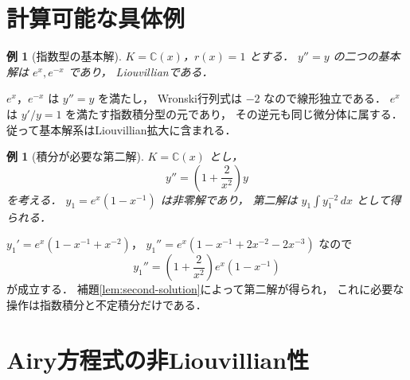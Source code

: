 \documentclass[a5paper,10pt,onecolumn]{jsarticle}
\makeatletter
\theoremstyle{mathnotetheorem}
\newtheorem{example}[theorem]{例}
\renewcommand{\proofname}{証明}
\renewenvironment{proof}[1][\proofname]{%
  \par\pushQED{\qed}\normalfont\topsep4\p@\@plus2\p@\relax
  \trivlist\item[\hskip\labelsep\bfseries #1]\ignorespaces
}{\popQED\endtrivlist\@endpefalse}
\makeatother
\begin{document}
\section{計算可能な具体例}

\begin{example}[指数型の基本解]
$K=\mathbb C(x)$，$r(x)=1$ とする．
$y''=y$ の二つの基本解は $e^x,e^{-x}$ であり，
Liouvillianである．
\end{example}
\begin{proof}
$e^x$，$e^{-x}$ は $y''=y$ を満たし，
Wronski行列式は $-2$ なので線形独立である．
$e^x$ は $y'/y=1$ を満たす指数積分型の元であり，
その逆元も同じ微分体に属する．
従って基本解系はLiouvillian拡大に含まれる．
\end{proof}

\begin{example}[積分が必要な第二解]
$K=\mathbb C(x)$ とし，
\[
 y''=\left(1+\frac2{x^2}\right)y
\]
を考える．
$y_1=e^x(1-x^{-1})$ は非零解であり，
第二解は $y_1\int y_1^{-2}\,dx$ として得られる．
\end{example}
\begin{proof}
$y_1'=e^x(1-x^{-1}+x^{-2})$，
$y_1''=e^x(1-x^{-1}+2x^{-2}-2x^{-3})$ なので
\[
 y_1''=\left(1+\frac2{x^2}\right)e^x(1-x^{-1})
\]
が成立する．
補題\ref{lem:second-solution}によって第二解が得られ，
これに必要な操作は指数積分と不定積分だけである．
\end{proof}

\section{Airy方程式の非Liouvillian性}
\end{document}
